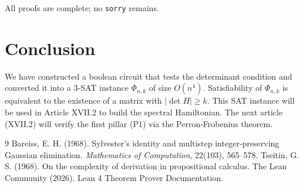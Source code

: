 \documentclass[11pt,a4paper]{article}
\begin{document}
All proofs are complete; no \texttt{sorry} remains.

\section{Conclusion}

We have constructed a boolean circuit that tests the determinant condition and converted it into a 3‑SAT instance $\Phi_{n,k}$ of size $O(n^4)$. Satisfiability of $\Phi_{n,k}$ is equivalent to the existence of a matrix with $|\det H| \ge k$. This SAT instance will be used in Article XVII.2 to build the spectral Hamiltonian. The next article (XVII.2) will verify the first pillar (P1) via the Perron‑Frobenius theorem.


\begin{thebibliography}{9}
  Bareiss, E. H. (1968). Sylvester's identity and multistep integer‑preserving Gaussian elimination. \emph{Mathematics of Computation}, 22(103), 565–578.
  Tseitin, G. S. (1968). On the complexity of derivation in propositional calculus.
  The Lean Community (2026). Lean 4 Theorem Prover Documentation.
\end{thebibliography}
\end{document}
